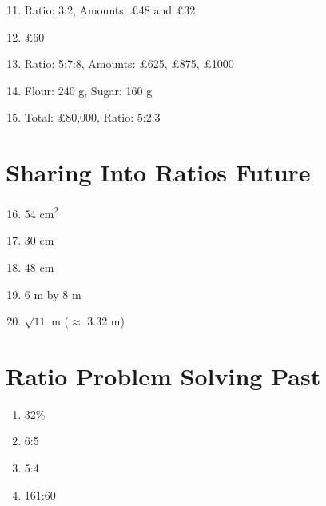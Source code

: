 \documentclass[12pt,a4paper]{article}
\begin{document}
\begin{enumerate}
    \setcounter{enumi}{10}
    \item Ratio: 3:2, Amounts: £48 and £32
    \item £60
    \item Ratio: 5:7:8, Amounts: £625, £875, £1000
    \item Flour: 240 g, Sugar: 160 g
    \item Total: £80,000, Ratio: 5:2:3
\end{enumerate}

\section*{Sharing Into Ratios Future}

\begin{enumerate}
    \setcounter{enumi}{15}
    \item 54 cm\textsuperscript{2}
    \item 30 cm
    \item 48 cm
    \item 6 m by 8 m
    \item \( \sqrt{11} \) m (\( \approx \) 3.32 m)
\end{enumerate}

\section*{Ratio Problem Solving Past}

\begin{enumerate}[start=21]
    \item 32\%
    \item 6:5
    \item 5:4
    \item 161:60
\end{enumerate}
\end{document}
